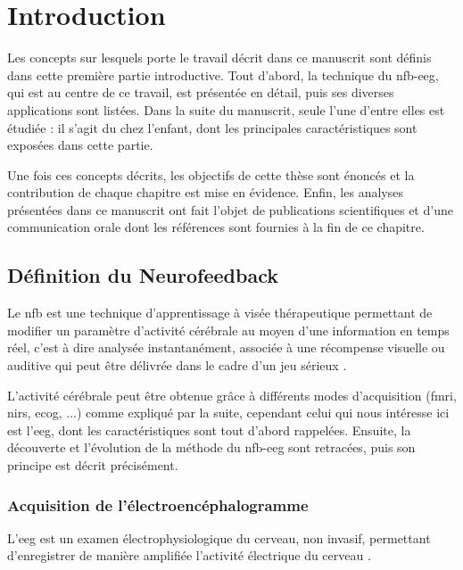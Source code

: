 \chapter{Introduction} \label{chapitre-1}

Les concepts sur lesquels porte le travail décrit dans ce manuscrit sont définis dans cette première partie introductive. Tout d'abord, la technique du \gls{nfb}-\gls{eeg}, 
qui est au centre de ce travail, est présentée en détail, puis ses diverses applications sont listées. Dans la suite du manuscrit, seule l'une d'entre elles est étudiée : 
il s'agit du  chez l'enfant, dont les principales caractéristiques sont exposées dans cette partie. 

Une fois ces concepts décrits, les objectifs de cette thèse sont énoncés et la contribution de chaque chapitre est mise en évidence. Enfin, les analyses 
présentées dans ce manuscrit ont fait l'objet de publications scientifiques et d'une communication orale dont les références sont fournies à la fin de ce chapitre. 

\clearpage 

\section{Définition du Neurofeedback}

Le \gls{nfb} est une technique d’apprentissage à visée thérapeutique permettant de modifier un paramètre d’activité cérébrale au moyen d’une 
information en temps réel, c'est à dire analysée instantanément, associée à une récompense visuelle ou auditive \citep{Arns2014} qui peut être délivrée
dans le cadre d'un jeu sérieux \citep{Wang2010}. 

L'activité cérébrale peut être obtenue grâce à différents modes d'acquisition (\gls{fmri}, \gls{nirs}, \gls{ecog}, ...) comme expliqué par la suite, 
cependant celui qui nous intéresse ici est l'\gls{eeg}, dont les caractéristiques sont tout d'abord
rappelées. Ensuite, la découverte et l'évolution de la méthode du \gls{nfb}-\gls{eeg} sont retracées, puis son principe est décrit précisément.

\subsection{Acquisition de l'électroencéphalogramme} \label{eeg_definition}

L'\gls{eeg} est un examen électrophysiologique du cerveau, non invasif, permettant d’enregistrer de manière amplifiée l'activité électrique du cerveau \citep{Nunez2006}. 

